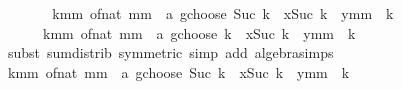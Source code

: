 \begin{isabellebody}
\ \ \isamarkupfalse%
\ \isamarkupfalse%
\ {\isachardoublequoteopen}{\isasymdots}\ {\isacharequal}{\kern0pt}\ {\isacharparenleft}{\kern0pt}{\isasymSum}k{\isacharequal}{\kern0pt}{}{\isachardot}{\kern0pt}{\isachardot}{\kern0pt}mm{\isachardot}{\kern0pt}\ {\isacharparenleft}{\kern0pt}of{\isacharunderscore}{\kern0pt}nat\ mm\ {\isacharplus}{\kern0pt}\ a\ gchoose\ {\isacharparenleft}{\kern0pt}Suc\ k{\isacharparenright}{\kern0pt}{\isacharparenright}{\kern0pt}\ {\isacharasterisk}{\kern0pt}\ x{\isacharcircum}{\kern0pt}{\isacharparenleft}{\kern0pt}Suc\ k{\isacharparenright}{\kern0pt}\ {\isacharasterisk}{\kern0pt}\ y{\isacharcircum}{\kern0pt}{\isacharparenleft}{\kern0pt}mm\ {\isacharminus}{\kern0pt}\ k{\isacharparenright}{\kern0pt}{\isacharparenright}{\kern0pt}\ {\isacharplus}{\kern0pt}\isanewline
\ \ \ \ \ \ {\isacharparenleft}{\kern0pt}{\isasymSum}k{\isacharequal}{\kern0pt}{}{\isachardot}{\kern0pt}{\isachardot}{\kern0pt}mm{\isachardot}{\kern0pt}\ {\isacharparenleft}{\kern0pt}of{\isacharunderscore}{\kern0pt}nat\ mm\ {\isacharplus}{\kern0pt}\ a\ gchoose\ k{\isacharparenright}{\kern0pt}\ {\isacharasterisk}{\kern0pt}\ x{\isacharcircum}{\kern0pt}{\isacharparenleft}{\kern0pt}Suc\ k{\isacharparenright}{\kern0pt}\ {\isacharasterisk}{\kern0pt}\ y{\isacharcircum}{\kern0pt}{\isacharparenleft}{\kern0pt}mm\ {\isacharminus}{\kern0pt}\ k{\isacharparenright}{\kern0pt}{\isacharparenright}{\kern0pt}{\isachardoublequoteclose}\isanewline
\ \ \ \ \isamarkupfalse%
\ {\isacharparenleft}{\kern0pt}subst\ sum{\isachardot}{\kern0pt}distrib\ {\isacharbrackleft}{\kern0pt}symmetric{\isacharbrackright}{\kern0pt}{\isacharparenright}{\kern0pt}\ {\isacharparenleft}{\kern0pt}simp\ add{\isacharcolon}{\kern0pt}\ algebra{\isacharunderscore}{\kern0pt}simps{\isacharparenright}{\kern0pt}\isanewline
\ \ \isamarkupfalse%
\ \isamarkupfalse%
\ {\isachardoublequoteopen}{\isacharparenleft}{\kern0pt}{\isasymSum}k{\isacharequal}{\kern0pt}{}{\isachardot}{\kern0pt}{\isachardot}{\kern0pt}mm{\isachardot}{\kern0pt}\ {\isacharparenleft}{\kern0pt}of{\isacharunderscore}{\kern0pt}nat\ mm\ {\isacharplus}{\kern0pt}\ a\ gchoose\ {\isacharparenleft}{\kern0pt}Suc\ k{\isacharparenright}{\kern0pt}{\isacharparenright}{\kern0pt}\ {\isacharasterisk}{\kern0pt}\ x{\isacharcircum}{\kern0pt}{\isacharparenleft}{\kern0pt}Suc\ k{\isacharparenright}{\kern0pt}\ {\isacharasterisk}{\kern0pt}\ y{\isacharcircum}{\kern0pt}{\isacharparenleft}{\kern0pt}mm\ {\isacharminus}{\kern0pt}\ k{\isacharparenright}{\kern0pt}{\isacharparenright}{\kern0pt}\ {\isacharequal}{\kern0pt}\isanewline

\end{isabellebody}

